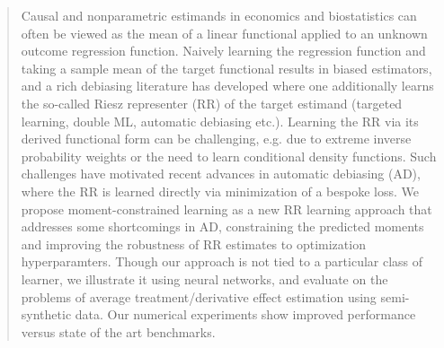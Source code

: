 \begin{abstract}

Causal and nonparametric estimands in economics and biostatistics can often be viewed as the mean of a linear functional applied to an unknown outcome regression function.  Naively learning the regression function and taking a sample mean of the target functional results in biased estimators, and a rich debiasing literature has developed where one additionally learns the so-called Riesz representer (RR) of the target estimand (targeted learning, double ML, automatic debiasing etc.). Learning the RR via its derived functional form can be challenging, e.g. due to extreme inverse probability weights or the need to learn conditional density functions. Such challenges have motivated recent advances in automatic debiasing (AD), where the RR is learned directly via minimization of a bespoke loss. We propose moment-constrained learning as a new RR learning approach that addresses some shortcomings in AD, constraining the predicted moments and improving the robustness of RR estimates to optimization hyperparamters. Though our approach is not tied to a particular class of learner, we illustrate it using neural networks, and evaluate on the problems of average treatment/derivative effect estimation using semi-synthetic data. Our numerical experiments show improved performance versus state of the art benchmarks.
\end{abstract}






